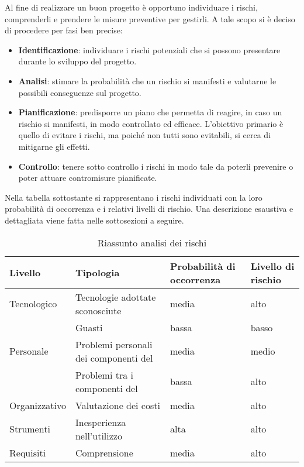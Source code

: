 	Al fine di realizzare un buon progetto  è opportuno individuare i rischi, comprenderli e prendere le misure preventive per gestirli. A tale scopo si è deciso di procedere per fasi ben precise:
	\begin{itemize}
		\item \textbf{Identificazione}: individuare i rischi potenziali che si possono presentare durante lo sviluppo del progetto.
		\item \textbf{Analisi}: stimare la probabilità che un rischio si manifesti e valutarne le possibili conseguenze sul progetto.
		\item \textbf{Pianificazione}: predisporre un piano che permetta di reagire, in caso un rischio si manifesti, in modo controllato ed efficace. L'obiettivo primario è quello di evitare i rischi, ma poiché non tutti sono evitabili, si cerca di mitigarne gli effetti.
		\item \textbf{Controllo}: tenere sotto controllo i rischi in modo tale da poterli prevenire o poter attuare contromisure pianificate.
	\end{itemize}
	Nella tabella sottostante si rappresentano i rischi individuati con la loro probabilità di occorrenza e i relativi livelli di rischio.
	Una descrizione esaustiva e dettagliata viene fatta nelle sottosezioni a seguire.
	\begin{table}[H]\centering \tabulinesep=3pt
			\begin{tabu}to \textwidth {|X[4]|X[3c]|X[4]|X[4]|}
				\hline
				Livello 			& Tipologia					& Probabilità di occorrenza 		& Livello di rischio  \\ \hline

				Tecnologico			& Tecnologie adottate sconosciute				& media 					& alto 		 \\ 
				  					& Guasti 								& bassa 					& basso 	 \\ \hline
				Personale		 	& Problemi personali dei componenti del 	& media 					& medio 	 \\ 
									& Problemi tra i componenti del 			& bassa 					& alto 		 \\ \hline
				Organizzativo	 	& Valutazione dei costi							& media 					& alto 		 \\ \hline
				Strumenti			& Inesperienza nell'utilizzo					& alta 						& alto 		 \\ \hline
				Requisiti		 	& Comprensione 									& media						& alto 		 \\ \hline
			\end{tabu}
		\caption{Riassunto analisi dei rischi}
	\end{table}


